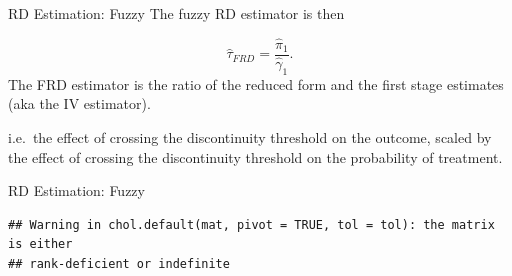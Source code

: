 \documentclass[
  ignorenonframetext,
]{beamer}
\newenvironment{Shaded}{\begin{snugshade}}{\end{snugshade}}
\newcommand{\CommentTok}[1]{\textcolor[rgb]{0.56,0.35,0.01}{\textit{#1}}}
\newcommand{\DecValTok}[1]{\textcolor[rgb]{0.00,0.00,0.81}{#1}}
\newcommand{\FunctionTok}[1]{\textcolor[rgb]{0.00,0.00,0.00}{#1}}
\newcommand{\NormalTok}[1]{#1}
\newcommand{\OtherTok}[1]{\textcolor[rgb]{0.56,0.35,0.01}{#1}}
\newcommand{\SpecialCharTok}[1]{\textcolor[rgb]{0.00,0.00,0.00}{#1}}
\begin{document}
\begin{frame}{RD Estimation: Fuzzy}
\protect\hypertarget{rd-estimation-fuzzy-2}{}
The fuzzy RD estimator is then

\[
\hat{\tau}_{FRD}=\frac{\hat{\pi}_1}{\hat{\gamma}_1}.
\] The FRD estimator is the ratio of the reduced form and the first
stage estimates (aka the IV estimator).

i.e.~the effect of crossing the discontinuity threshold on the outcome,
scaled by the effect of crossing the discontinuity threshold on the
probability of treatment.
\end{frame}

\begin{frame}[fragile]{RD Estimation: Fuzzy}
\protect\hypertarget{rd-estimation-fuzzy-3}{}
\tiny

\begin{Shaded}
\end{Shaded}

\begin{verbatim}
## Warning in chol.default(mat, pivot = TRUE, tol = tol): the matrix is either
## rank-deficient or indefinite
\end{verbatim}
\end{frame}
\end{document}
